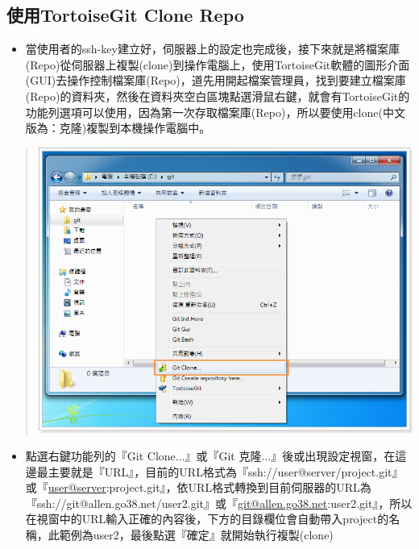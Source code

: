 \documentclass[letterpaper,10pt,english]{sphinxmanual}
\begin{document}
\subsection{使用TortoiseGit Clone Repo}
\label{_doc/writing/index:tortoisegit-clone-repo}\begin{itemize}
\item {} 
當使用者的ssh-key建立好，伺服器上的設定也完成後，接下來就是將檔案庫(Repo)從伺服器上複製(clone)到操作電腦上，使用TortoiseGit軟體的圖形介面(GUI)去操作控制檔案庫(Repo)，道先用開起檔案管理員，找到要建立檔案庫(Repo)的資料夾，然後在資料夾空白區塊點選滑鼠右鍵，就會有TortoiseGit的功能列選項可以使用，因為第一次存取檔案庫(Repo)，所以要使用clone(中文版為：克隆)複製到本機操作電腦中。

\end{itemize}
\begin{quote}

\includegraphics{tortoisegit-clone-001.png}
\end{quote}
\begin{itemize}
\item {} 
點選右鍵功能列的『Git Clone...』或『Git 克隆...』後或出現設定視窗，在這邊最主要就是『URL』，目前的URL格式為『ssh://user@server/project.git』或『\href{mailto:user@server}{user@server}:project.git』，依URL格式轉換到目前伺服器的URL為『ssh://git@allen.go38.net/user2.git』或『\href{mailto:git@allen.go38.net}{git@allen.go38.net}:user2.git』，所以在視窗中的URL輸入正確的內容後，下方的目錄欄位會自動帶入project的名稱，此範例為user2，最後點選『確定』就開始執行複製(clone)

\end{itemize}
\end{document}
